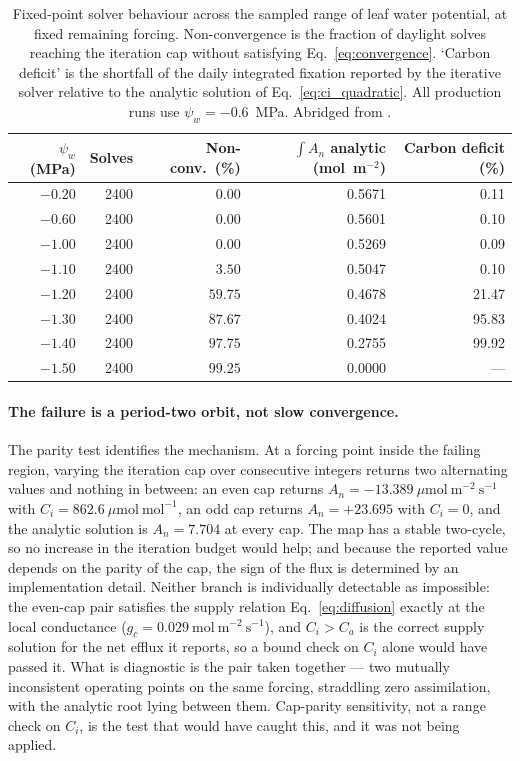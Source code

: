 \documentclass[a4paper,fleqn]{cas-sc}
\begin{document}
\begin{table}[!htbp]
\centering
\small
\caption{Fixed-point solver behaviour across the sampled range of leaf water
potential, at fixed remaining forcing. Non-convergence is the fraction of
daylight solves reaching the iteration cap without satisfying
Eq.~\eqref{eq:convergence}. `Carbon deficit' is the shortfall of the daily
integrated fixation reported by the iterative solver relative to the analytic
solution of Eq.~\eqref{eq:ci_quadratic}. All production runs use
$\psi_w=-0.6$~MPa. Abridged from
\protect{}.}
\label{tab:water_stress}
\begin{tabular}{@{}rrrrr@{}}
\toprule
$\psi_w$ (MPa) & Solves & Non-conv.\ (\%) & $\int A_n$ analytic (mol~m$^{-2}$) & Carbon deficit (\%) \\
\midrule
$-0.20$ & 2400 & $0.00$  & 0.5671 & 0.11 \\
$-0.60$ & 2400 & $0.00$  & 0.5601 & 0.10 \\
$-1.00$ & 2400 & $0.00$  & 0.5269 & 0.09 \\
$-1.10$ & 2400 & $3.50$  & 0.5047 & 0.10 \\
$-1.20$ & 2400 & $59.75$ & 0.4678 & 21.47 \\
$-1.30$ & 2400 & $87.67$ & 0.4024 & 95.83 \\
$-1.40$ & 2400 & $97.75$ & 0.2755 & 99.92 \\
$-1.50$ & 2400 & $99.25$ & 0.0000 & --- \\
\bottomrule
\end{tabular}
\end{table}

\paragraph{The failure is a period-two orbit, not slow convergence.}
The parity test identifies the mechanism. At a forcing point inside the
failing region, varying the iteration cap over consecutive integers returns
two alternating values and nothing in between: an even cap returns
$A_n = -13.389\ \mu\mathrm{mol\ m^{-2}\ s^{-1}}$ with
$C_i = 862.6\ \mu\mathrm{mol\ mol^{-1}}$, an odd cap returns
$A_n = +23.695$ with $C_i = 0$, and the analytic solution is
$A_n = 7.704$ at every cap. The map has a stable two-cycle, so no increase in
the iteration budget would help; and because the reported value depends on the
parity of the cap, the sign of the flux is determined by an implementation
detail. Neither branch is individually detectable as impossible: the even-cap
pair satisfies the supply relation Eq.~\eqref{eq:diffusion} exactly at the
local conductance ($g_c = 0.029\ \mathrm{mol\ m^{-2}\ s^{-1}}$), and
$C_i > C_a$ is the correct supply solution for the net efflux it reports, so a
bound check on $C_i$ alone would have passed it. What is diagnostic is the pair
taken together --- two mutually inconsistent operating points on the same
forcing, straddling zero assimilation, with the analytic root lying between
them. Cap-parity sensitivity, not a range check on $C_i$, is the test that
would have caught this, and it was not being applied.
\end{document}
